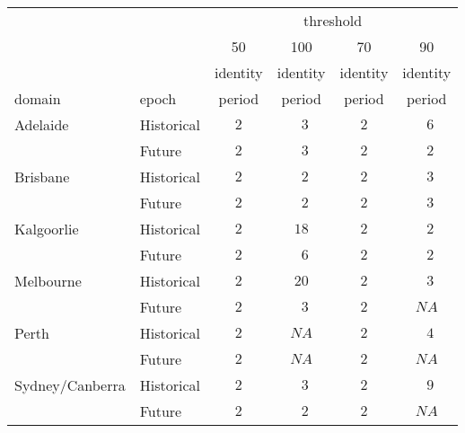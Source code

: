 \begin{tabular}{llcccc}
\hline
& & \multicolumn{4}{c}{threshold} \\ 
& & 50 & 100 & 70 & \multicolumn{1}{c}{90} \\ 
& & identity & identity & identity & \multicolumn{1}{c}{identity} \\ 
domain & epoch & period & period & period & \multicolumn{1}{c}{period} \\ 
\hline
Adelaide & Historical  & $2$ & $\phantom{0}3$ & $2$ & $\phantom{0}6$ \\
 & Future  & $2$ & $\phantom{0}3$ & $2$ & $\phantom{0}2$ \\
Brisbane & Historical  & $2$ & $\phantom{0}2$ & $2$ & $\phantom{0}3$ \\
 & Future  & $2$ & $\phantom{0}2$ & $2$ & $\phantom{0}3$ \\
Kalgoorlie & Historical  & $2$ & $18$ & $2$ & $\phantom{0}2$ \\
 & Future  & $2$ & $\phantom{0}6$ & $2$ & $\phantom{0}2$ \\
Melbourne & Historical  & $2$ & $20$ & $2$ & $\phantom{0}3$ \\
 & Future  & $2$ & $\phantom{0}3$ & $2$ & $NA$ \\
Perth & Historical  & $2$ & $NA$ & $2$ & $\phantom{0}4$ \\
 & Future  & $2$ & $NA$ & $2$ & $NA$ \\
Sydney/Canberra & Historical  & $2$ & $\phantom{0}3$ & $2$ & $\phantom{0}9$ \\
 & Future  & $2$ & $\phantom{0}2$ & $2$ & $NA$ \\
\hline 
\end{tabular}
